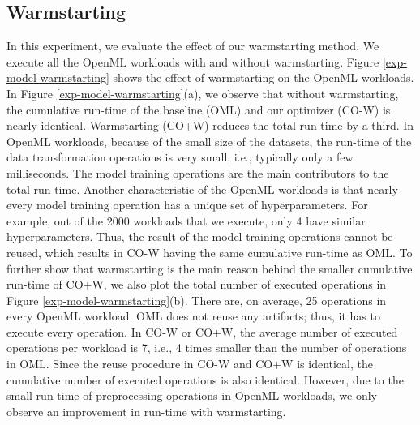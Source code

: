 \subsection{Warmstarting}
In this experiment, we evaluate the effect of our warmstarting method.
We execute all the OpenML workloads with and without warmstarting.
Figure \ref{exp-model-warmstarting} shows the effect of warmstarting on the OpenML workloads.
In Figure \ref{exp-model-warmstarting}(a), we observe that without warmstarting, the cumulative run-time of the baseline (OML) and our optimizer (CO-W) is nearly identical.
Warmstarting (CO+W) reduces the total run-time by a third.
In OpenML workloads, because of the small size of the datasets, the run-time of the data transformation operations is very small, i.e., typically only a few milliseconds.
The model training operations are the main contributors to the total run-time.
Another characteristic of the OpenML workloads is that nearly every model training operation has a unique set of hyperparameters.
For example, out of the 2000 workloads that we execute, only 4 have similar hyperparameters.
Thus, the result of the model training operations cannot be reused, which results in CO-W having the same cumulative run-time as OML.
To further show that warmstarting is the main reason behind the smaller cumulative run-time of CO+W, we also plot the total number of executed operations in Figure \ref{exp-model-warmstarting}(b).
There are, on average, 25 operations in every OpenML workload.
OML does not reuse any artifacts; thus, it has to execute every operation.
In CO-W or CO+W, the average number of executed operations per workload is 7, i.e., 4 times smaller than the number of operations in OML.
Since the reuse procedure in CO-W and CO+W is identical, the cumulative number of executed operations is also identical.
However, due to the small run-time of preprocessing operations in OpenML workloads, we only observe an improvement in run-time with warmstarting.  